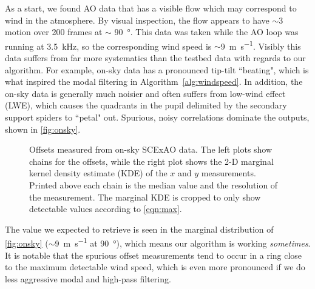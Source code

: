 As a start, we found AO data that has a visible flow which may correspond to wind in the atmosphere. By visual inspection, the flow appears to have $\sim$\SI{3}{\pixel} motion over 200 frames at $\sim$ \SI{90}{\degree}. This data was taken while the AO loop was running at \SI{3.5}{\kilo\hertz}, so the corresponding wind speed is $\sim$\SI{9}{\meter\per\second}. Visibly this data suffers from far more systematics than the testbed data with regards to our algorithm. For example, on-sky data has a pronounced tip-tilt ``beating", which is what inspired the modal filtering in Algorithm~\autoref{alg:windspeed}. In addition, the on-sky data is generally much noisier and often suffers from low-wind effect (LWE), which causes the quadrants in the pupil delimited by the secondary support spiders to ``petal" out. Spurious, noisy correlations dominate the outputs, shown in \autoref{fig:onsky}.

\begin{figure}
    \centering
    \caption{Offsets measured from on-sky SCExAO data. The left plots show chains for the offsets, while the right plot shows the 2-D marginal kernel density estimate (KDE) of the $x$ and $y$ measurements. Printed above each chain is the median value and the resolution of the measurement. The marginal KDE is cropped to only show detectable values according to \autoref{eqn:max}.}
    \label{fig:onsky}
\end{figure}

The value we expected to retrieve is seen in the marginal distribution of \autoref{fig:onsky} ($\sim$\SI{9}{\meter\per\second} at \SI{90}{\degree}), which means our algorithm is working \textit{sometimes}. It is notable that the spurious offset measurements tend to occur in a ring close to the maximum detectable wind speed, which is even more pronounced if we do less aggressive modal and high-pass filtering.
